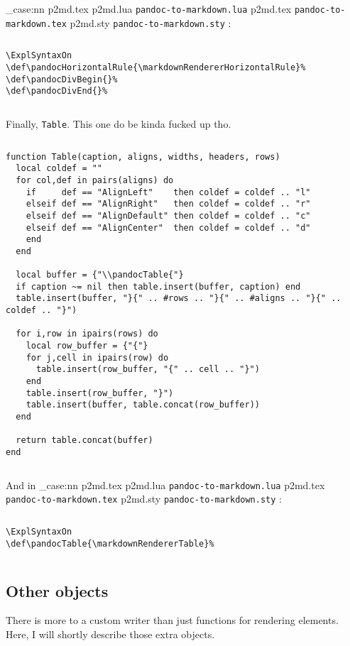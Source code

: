 \documentclass[
  digital,     %
  oneside,     %
  nosansbold,  %
  nocolorbold, %
  lof,         %
  lot,         %
]{fithesis4}
\newcommand\file[1]
  {
    \str_case:nn
      { #1 }
      {
        { p2md.lua } { \texttt{pandoc\hyp{}to\hyp{}markdown.lua} }
        { p2md.tex } { \texttt{pandoc\hyp{}to\hyp{}markdown.tex} }
        { p2md.sty } { \texttt{pandoc\hyp{}to\hyp{}markdown.sty} }
      }
  }
\begin{document}
\noindent
\file{p2md.tex}:

$ $

\noindent
\lstset{language=[plain]TeX}
\begin{lstlisting}
\ExplSyntaxOn
\def\pandocHorizontalRule{\markdownRendererHorizontalRule}%
\def\pandocDivBegin{}%
\def\pandocDivEnd{}%
\end{lstlisting}

$ $

\noindent
Finally, \texttt{Table}. This one do be kinda fucked up tho.

$ $

\noindent
\lstset{language=[5.3]Lua}
\begin{lstlisting}
function Table(caption, aligns, widths, headers, rows)
  local coldef = ""
  for col,def in pairs(aligns) do
    if     def == "AlignLeft"    then coldef = coldef .. "l"
    elseif def == "AlignRight"   then coldef = coldef .. "r"
    elseif def == "AlignDefault" then coldef = coldef .. "c"
    elseif def == "AlignCenter"  then coldef = coldef .. "d"
    end
  end

  local buffer = {"\\pandocTable{"}
  if caption ~= nil then table.insert(buffer, caption) end
  table.insert(buffer, "}{" .. #rows .. "}{" .. #aligns .. "}{" .. coldef .. "}")

  for i,row in ipairs(rows) do
    local row_buffer = {"{"}
    for j,cell in ipairs(row) do
      table.insert(row_buffer, "{" .. cell .. "}")
    end
    table.insert(row_buffer, "}")
    table.insert(buffer, table.concat(row_buffer))
  end

  return table.concat(buffer)
end
\end{lstlisting}

$ $

\noindent
And in \file{p2md.tex}:

$ $

\noindent
\lstset{language=[plain]TeX}
\begin{lstlisting}
\ExplSyntaxOn
\def\pandocTable{\markdownRendererTable}%
\end{lstlisting}

$ $

\subsection{Other objects}
There is more to a custom writer than just functions for rendering elements. Here, I will shortly describe those extra objects.
\end{document}
